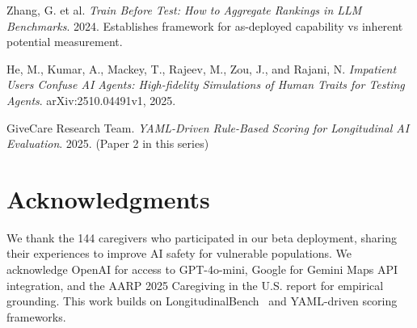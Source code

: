 \documentclass{article}
\begin{document}
\begin{thebibliography}{99}
Zhang, G. et al.
\textit{Train Before Test: How to Aggregate Rankings in LLM Benchmarks}.
2024. Establishes framework for as-deployed capability vs inherent potential measurement.

He, M., Kumar, A., Mackey, T., Rajeev, M., Zou, J., and Rajani, N.
\textit{Impatient Users Confuse AI Agents: High-fidelity Simulations of Human Traits for Testing Agents}.
arXiv:2510.04491v1, 2025.

GiveCare Research Team.
\textit{YAML-Driven Rule-Based Scoring for Longitudinal AI Evaluation}.
2025. (Paper 2 in this series)

\end{thebibliography}%
\section{Acknowledgments}%
\label{sec:Acknowledgments}%
We thank the 144 caregivers who participated in our beta deployment, sharing their experiences to improve AI safety for vulnerable populations. We acknowledge OpenAI for access to GPT-4o-mini, Google for Gemini Maps API integration, and the AARP 2025 Caregiving in the U.S. report for empirical grounding. This work builds on LongitudinalBench~\cite{longitudinalbench} and YAML-driven scoring~\cite{yaml-scoring} frameworks.

%
\end{document}
